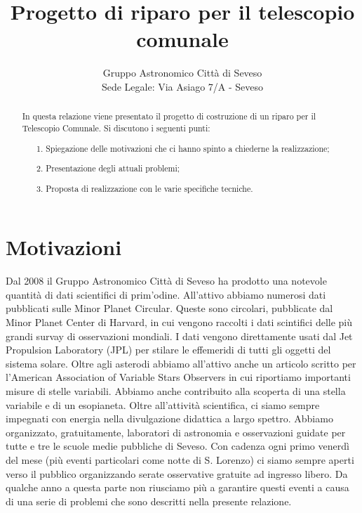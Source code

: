 \documentclass[a4paper,12pt]{article}
\begin{document}
\title{\bf \Huge Progetto di riparo per il telescopio comunale\\ }


\author{Gruppo Astronomico Città di Seveso\\
Sede Legale: Via Asiago 7/A - Seveso
}


\maketitle
\begin{abstract}
In questa relazione viene presentato il progetto di costruzione di un riparo per il Telescopio Comunale. Si discutono i seguenti punti:
	\begin{itemize}
		\item[1.] Spiegazione delle motivazioni che ci hanno spinto a chiederne la realizzazione;
		\item[2.] Presentazione degli attuali problemi;
		\item[3.] Proposta di realizzazione con le varie specifiche tecniche.
	\end{itemize}
\end{abstract}

\section{Motivazioni}
Dal 2008 il Gruppo Astronomico Citt\`a di Seveso ha prodotto una notevole quantit\`a di dati scientifici di prim'odine. All'attivo abbiamo numerosi dati pubblicati sulle Minor Planet Circular. Queste sono circolari, pubblicate dal Minor Planet Center di Harvard, in cui vengono raccolti i dati scintifici delle pi\`u grandi survay di osservazioni mondiali. I dati vengono direttamente usati dal Jet Propulsion Laboratory (JPL) per stilare le effemeridi di tutti gli oggetti del sistema solare. Oltre agli asterodi abbiamo all'attivo anche un articolo scritto per l'American Association of Variable Stars Observers in cui riportiamo importanti misure di stelle variabili. Abbiamo anche contribuito alla scoperta di una stella variabile e di un esopianeta. Oltre all'attivit\`a scientifica, ci siamo sempre impegnati con energia nella divulgazione didattica a largo spettro. Abbiamo organizzato, gratuitamente, laboratori di astronomia e osservazioni guidate per tutte e tre le scuole medie pubbliche di Seveso. Con cadenza ogni primo venerd\`i del mese (pi\`u eventi particolari come notte di S. Lorenzo) ci siamo sempre aperti verso il pubblico organizzando serate osservative gratuite ad ingresso libero. Da qualche anno a questa parte non riusciamo pi\`u a garantire questi eventi a causa di una serie di problemi che sono descritti nella presente relazione.
\end{document}
